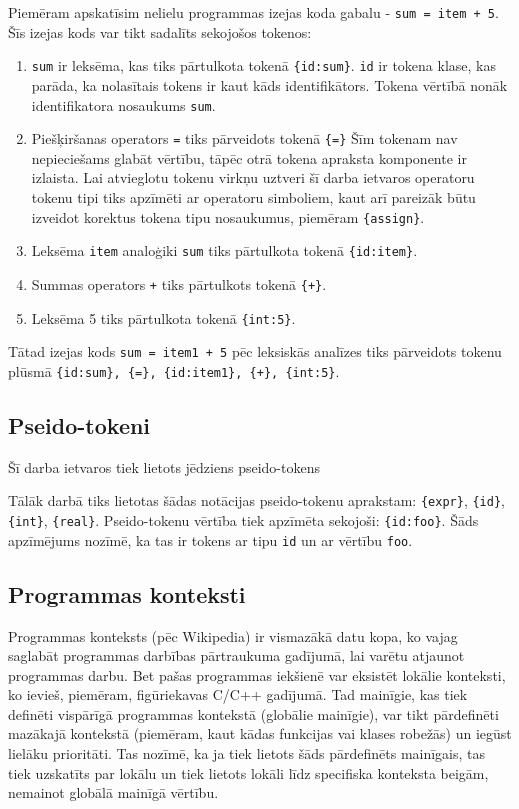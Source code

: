 Piemēram apskatīsim nelielu programmas izejas koda gabalu - \verb|sum = item + 5|. Šīs izejas kods var tikt sadalīts sekojošos tokenos:
\begin{enumerate}
\item \verb|sum| ir leksēma, kas tiks pārtulkota tokenā \verb|{id:sum}|. \verb|id| ir tokena klase, kas parāda, ka nolasītais tokens ir kaut kāds identifikātors. Tokena vērtībā nonāk identifikatora nosaukums \verb|sum|.
\item Piešķiršanas operators \verb|=| tiks pārveidots tokenā \verb|{=}| Šīm tokenam nav nepieciešams glabāt vērtību, tāpēc otrā tokena apraksta komponente ir izlaista. Lai atvieglotu tokenu virkņu uztveri šī darba ietvaros operatoru tokenu tipi tiks apzīmēti ar operatoru simboliem, kaut arī pareizāk būtu izveidot korektus tokena tipu nosaukumus, piemēram \verb|{assign}|.
\item Leksēma \verb|item| analoģiki \verb|sum| tiks pārtulkota tokenā \verb|{id:item}|.
\item Summas operators \verb|+| tiks pārtulkots tokenā \verb|{+}|.
\item Leksēma 5 tiks pārtulkota tokenā \verb|{int:5}|.
\end{enumerate}

Tātad izejas kods \verb|sum = item1 + 5| pēc leksiskās analīzes tiks pārveidots tokenu plūsmā \verb|{id:sum}, {=}, {id:item1}, {+}, {int:5}|. \cite{DragonBook}

\subsection{Pseido-tokeni}
Šī darba ietvaros tiek lietots jēdziens pseido-tokens

Tālāk darbā tiks lietotas šādas notācijas pseido-tokenu aprakstam: \verb|{expr}|, \verb|{id}|, \verb|{int}|, \verb|{real}|. Pseido-tokenu vērtība tiek apzīmēta sekojoši: \verb|{id:foo}|. Šāds apzīmējums nozīmē, ka tas ir tokens ar tipu \verb|id| un ar vērtību \verb|foo|.

\subsection{Programmas konteksti}
Programmas konteksts (pēc Wikipedia) ir vismazākā datu kopa, ko vajag saglabāt programmas darbības pārtraukuma gadījumā, lai varētu atjaunot programmas darbu. Bet pašas programmas iekšienē var eksistēt lokālie konteksti, ko ievieš, piemēram, figūriekavas C/C++ gadījumā. Tad mainīgie, kas tiek definēti vispārīgā programmas kontekstā (globālie mainīgie), var tikt pārdefinēti mazākajā kontekstā (piemēram, kaut kādas funkcijas vai klases robežās) un iegūst lielāku prioritāti. Tas nozīmē, ka ja tiek lietots šāds pārdefinēts mainīgais, tas tiek uzskatīts par lokālu un tiek lietots lokāli līdz specifiska konteksta beigām, nemainot globālā mainīgā vērtību.

